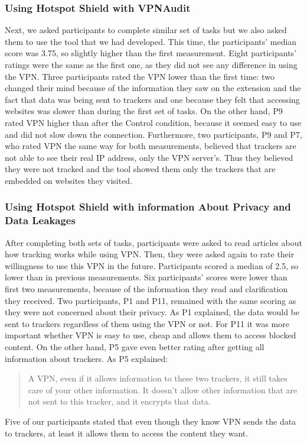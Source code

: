 \subsubsection{Using Hotspot Shield with VPNAudit}

Next, we asked participants to complete similar set of tasks but we also asked
them to use the tool that we had developed. This time, the participants'
median score was  3.75, so slightly higher than the first measurement. Eight
participants' ratings were the same as the first one, as they did not see any
difference in using the VPN. Three participants rated the VPN lower than the
first time: two changed their mind because of the information they saw on the
extension and the fact that data was being sent to trackers and one because
they felt that accessing websites was slower than during the first set of
tasks.  On the other hand, P9 rated VPN higher than after the Control
condition, because it seemed easy to use and did not slow down the connection.
Furthermore, two participants, P9 and P7, who rated VPN the same way for both
measurements, believed that trackers are not able to see their real IP
address, only the VPN server’s. Thus they believed they were not tracked and
the tool showed them only the trackers that are embedded on websites they
visited. 

\subsubsection{Using Hotspot Shield with information About Privacy and Data Leakages} 

After completing both sets of tasks, participants were asked to read articles
about how tracking works while using VPN. Then, they were asked again to rate
their willingness to use this VPN in the future. Participants scored a median
of 2.5, so lower than in previous measurements. Six participants' scores were
lower than first two measurements, because of the information they read and
clarification they received. Two participants, P1 and P11, remained with the
same scoring as they were not concerned about their privacy. As P1 explained,
the data would be sent to trackers regardless of them using the VPN or not.
For P11 it was more important whether VPN is easy to use, cheap and allows
them to access blocked content. On the other hand, P5 gave even better rating
after getting all information about trackers. As P5 explained:

\begin{quote}A VPN, even if it allows information to these two trackers, it
still takes care of your other information. It doesn't allow other information
that are not sent to this tracker, and it encrypts that data.\end{quote} Five
of our participants stated that even though they know VPN sends the data to
trackers, at least it allows them to access the content they want.   


